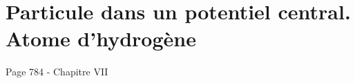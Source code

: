 \chapter{Particule dans un potentiel central. Atome d'hydrogène}
\label{chapter:potentiel_central}
Page 784 - Chapitre VII
